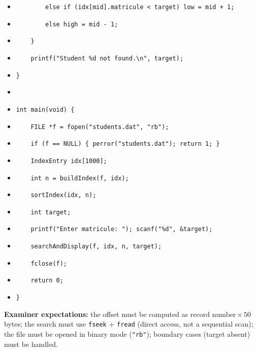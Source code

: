 \documentclass[11pt]{article}
\begin{document}
\begin{corrige}
\begin{itemize}
\item[] \texttt{\ \ \ \ \ \ \ \ else if (idx[mid].matricule < target) low = mid + 1;}
\item[] \texttt{\ \ \ \ \ \ \ \ else high = mid - 1;}
\item[] \texttt{\ \ \ \ \}}
\item[] \texttt{\ \ \ \ printf("Student \%d not found.\textbackslash n", target);}
\item[] \texttt{\}}
\item[] \texttt{}
\item[] \texttt{int main(void) \{}
\item[] \texttt{\ \ \ \ FILE *f = fopen("students.dat", "rb");}
\item[] \texttt{\ \ \ \ if (f == NULL) \{ perror("students.dat"); return 1; \}}
\item[] \texttt{\ \ \ \ IndexEntry idx[1000];}
\item[] \texttt{\ \ \ \ int n = buildIndex(f, idx);}
\item[] \texttt{\ \ \ \ sortIndex(idx, n);}
\item[] \texttt{\ \ \ \ int target;}
\item[] \texttt{\ \ \ \ printf("Enter matricule: "); scanf("\%d", \&target);}
\item[] \texttt{\ \ \ \ searchAndDisplay(f, idx, n, target);}
\item[] \texttt{\ \ \ \ fclose(f);}
\item[] \texttt{\ \ \ \ return 0;}
\item[] \texttt{\}}
\end{itemize}

\textbf{Examiner expectations:} the offset must be computed as $\text{record number} \times 50$ bytes; the search must use \texttt{fseek} + \texttt{fread} (direct access, not a sequential scan); the file must be opened in binary mode (\texttt{"rb"}); boundary cases (target absent) must be handled.
\end{corrige}
\end{document}

